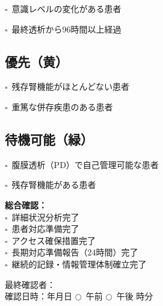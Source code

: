 \documentclass[a4paper,12pt]{jarticle}
\newcommand{\checkbox}{$\square$\ }
\newcommand{\underlinespace}[1]{\underline{\hspace{#1}}}
\newcommand{\circlecheck}{$\bigcirc$\ }
\begin{document}
\checkbox 意識レベルの変化がある患者

\checkbox 最終透析から96時間以上経過

\subsection*{優先（黄）}
\checkbox 残存腎機能がほとんどない患者

\checkbox 重篤な併存疾患のある患者

\subsection*{待機可能（緑）}
\checkbox 腹膜透析（PD）で自己管理可能な患者

\checkbox 残存腎機能がある患者

\vspace{5mm}

\noindent
\textbf{総合確認：} \\
\checkbox 詳細状況分析完了 \\
\checkbox 患者対応準備完了 \\
\checkbox アクセス確保措置完了 \\
\checkbox 長期対応準備報告（24時間）完了 \\
\checkbox 継続的記録・情報管理体制確立完了

\vspace{5mm}

\noindent
最終確認者：\underlinespace{4cm} \\
\vspace{3mm}
確認日時：\underlinespace{2cm}年\underlinespace{1cm}月\underlinespace{1cm}日 \quad \circlecheck 午前 \quad \circlecheck 午後 \quad \underlinespace{1cm}時\underlinespace{1cm}分
\end{document}
